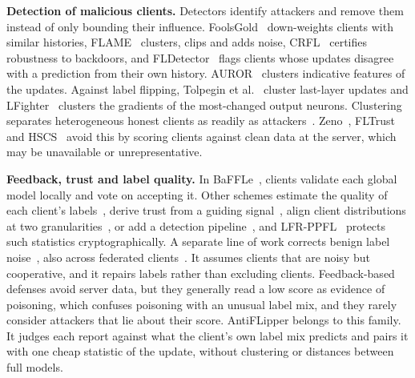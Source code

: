\documentclass[conference]{IEEEtran}
\begin{document}
\textbf{Detection of malicious clients.} Detectors identify attackers and remove them instead of only bounding their influence. FoolsGold~\cite{fung2020limitations} down-weights clients with similar histories, FLAME~\cite{nguyen2022flame} clusters, clips and adds noise, CRFL~\cite{xie2021crfl} certifies robustness to backdoors, and FLDetector~\cite{zhang2022fldetector} flags clients whose updates disagree with a prediction from their own history. AUROR~\cite{shen2016auror} clusters indicative features of the updates. Against label flipping, Tolpegin et al.~\cite{tolpegin2020data} cluster last-layer updates and LFighter~\cite{jebreel2024lfighter} clusters the gradients of the most-changed output neurons. Clustering separates heterogeneous honest clients as readily as attackers~\cite{li2023hscs,shen2024lfrppfl}. Zeno~\cite{xie2019zeno}, FLTrust~\cite{cao2020fltrust} and HSCS~\cite{li2023hscs} avoid this by scoring clients against clean data at the server, which may be unavailable or unrepresentative.

\textbf{Feedback, trust and label quality.} In BaFFLe~\cite{andreina2021baffle}, clients validate each global model locally and vote on accepting it. Other schemes estimate the quality of each client's labels~\cite{jiang2023dataquality,ovi2023confident}, derive trust from a guiding signal~\cite{li2025flgt}, align client distributions at two granularities~\cite{fedalign2026}, or add a detection pipeline~\cite{abroshan2025aitoprotect}, and LFR-PPFL~\cite{shen2024lfrppfl} protects such statistics cryptographically. A separate line of work corrects benign label noise~\cite{song2023noisylabels}, also across federated clients~\cite{xu2022fedcorr}. It assumes clients that are noisy but cooperative, and it repairs labels rather than excluding clients. Feedback-based defenses avoid server data, but they generally read a low score as evidence of poisoning, which confuses poisoning with an unusual label mix, and they rarely consider attackers that lie about their score. AntiFLipper belongs to this family. It judges each report against what the client's own label mix predicts and pairs it with one cheap statistic of the update, without clustering or distances between full models.

\end{document}

